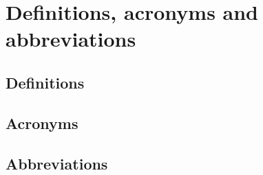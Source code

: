 \section{Definitions, acronyms and abbreviations}

\subsection{Definitions}

\subsection{Acronyms}

\subsection{Abbreviations}
